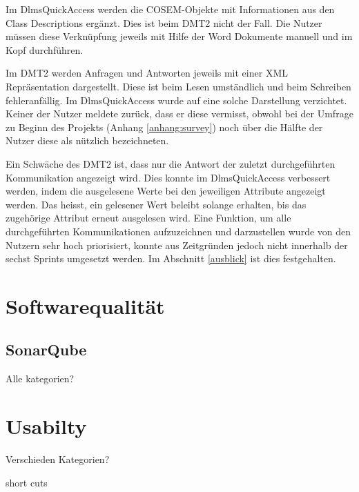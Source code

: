 Im DlmsQuickAccess werden die \ac{COSEM}-Objekte mit Informationen aus den Class Descriptions ergänzt.
Dies ist beim \ac{DMT2} nicht der Fall.
Die Nutzer müssen diese Verknüpfung jeweils mit Hilfe der Word Dokumente manuell und im Kopf durchführen.

Im \ac{DMT2} werden Anfragen und Antworten jeweils mit einer XML Repräsentation dargestellt.
Diese ist beim Lesen umständlich und beim Schreiben fehleranfällig.
Im DlmsQuickAccess wurde auf eine solche Darstellung verzichtet.
Keiner der Nutzer meldete zurück, dass er diese vermisst, obwohl bei der Umfrage zu Beginn des Projekts (Anhang \ref{anhang:survey}) noch über die Hälfte der Nutzer diese als nützlich bezeichneten.

Ein Schwäche des \ac{DMT2} ist, dass nur die Antwort der zuletzt durchgeführten Kommunikation angezeigt wird.
Dies konnte im DlmsQuickAccess verbessert werden, indem die ausgelesene Werte bei den jeweiligen Attribute angezeigt werden.
Das heisst, ein gelesener Wert beleibt solange erhalten, bis das zugehörige Attribut erneut ausgelesen wird.
Eine Funktion, um alle durchgeführten Kommunikationen aufzuzeichnen und darzustellen wurde von den Nutzern sehr hoch priorisiert, konnte aus Zeitgründen jedoch nicht innerhalb der sechst Sprints umgesetzt werden.
Im Abschnitt \ref{ausblick} ist dies festgehalten.



\section{Softwarequalität}\label{evalQuality}

\subsection{SonarQube}
Alle kategorien?


\section{Usabilty}
Verschieden Kategorien?

short cuts